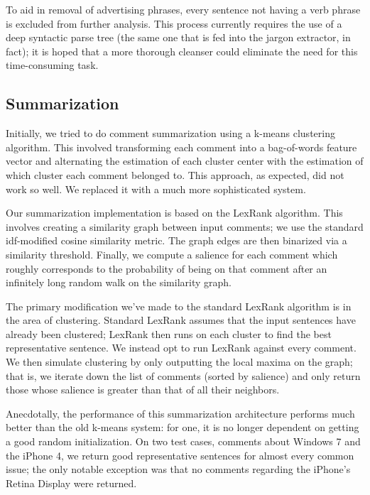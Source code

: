 \documentclass{article}
\begin{document}
To aid in removal of advertising phrases, every sentence not having a verb
phrase is excluded from further analysis. This process currently requires the
use of a deep syntactic parse tree (the same one that is fed into the jargon
extractor, in fact); it is hoped that a more thorough cleanser could eliminate
the need for this time-consuming task.



\subsection{Summarization} %

Initially, we tried to do comment summarization using a k-means clustering
algorithm. This involved transforming each comment into a bag-of-words feature
vector and alternating the estimation of each cluster center with the
estimation of which cluster each comment belonged to. This approach, as
expected, did not work so well. We replaced it with a much more sophisticated
system.

Our summarization implementation is based on the LexRank algorithm.
This involves creating a similarity graph between input comments;
we use the standard idf-modified cosine similarity metric. The
graph edges are then binarized via a similarity threshold. Finally,
we compute a salience for each comment which roughly corresponds
to the probability of being on that comment after an infinitely
long random walk on the similarity graph.

The primary modification we've made to the standard LexRank
algorithm is in the area of clustering. Standard LexRank assumes
that the input sentences have already been clustered; LexRank then
runs on each cluster to find the best representative sentence. We
instead opt to run LexRank against every comment. We then simulate
clustering by only outputting the local maxima on the graph; that
is, we iterate down the list of comments (sorted by salience) and
only return those whose salience is greater than that of all their
neighbors.

Anecdotally, the performance of this summarization architecture
performs much better than the old k-means system: for one, it is no
longer dependent on getting a good random initialization. On two
test cases, comments about Windows 7 and the iPhone 4, we return
good representative sentences for almost every common issue; the
only notable exception was that no comments regarding the iPhone's
Retina Display were returned.
\end{document}
